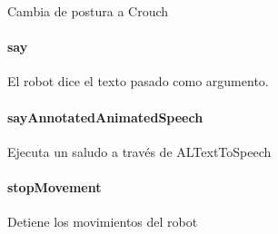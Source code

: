 \begin{fulllineitems}
\label{\detokenize{dev_docs:com.lar.cloudnao.Robot.rest()}}
Cambia de postura a Crouch

\end{fulllineitems}



\paragraph{say}
\label{\detokenize{dev_docs:say}}

\begin{fulllineitems}
\label{\detokenize{dev_docs:com.lar.cloudnao.Robot.say(String)}}
El robot dice el texto pasado como argumento.

\end{fulllineitems}



\paragraph{sayAnnotatedAnimatedSpeech}
\label{\detokenize{dev_docs:sayannotatedanimatedspeech}}

\begin{fulllineitems}
\label{\detokenize{dev_docs:com.lar.cloudnao.Robot.sayAnnotatedAnimatedSpeech(String)}}
Ejecuta un saludo a través de ALTextToSpeech

\end{fulllineitems}



\paragraph{stopMovement}
\label{\detokenize{dev_docs:stopmovement}}

\begin{fulllineitems}
\label{\detokenize{dev_docs:com.lar.cloudnao.Robot.stopMovement()}}
Detiene los movimientos del robot

\end{fulllineitems}




